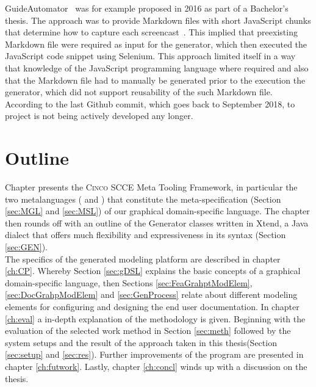 GuideAutomator~\cite{oliveira2016guideautomator} was for example proposed in 2016 as part of a Bachelor's thesis. The approach was to provide Markdown files with short JavaScript chunks that determine how to capture each screencast~\cite{guidAutomatorGithub}. This implied that preexisting Markdown file were required as input for the generator, which then executed the JavaScript code snippet using Selenium. This approach limited itself in a way that knowledge of the JavaScript programming language where required and also that the Markdown file had to manually be generated prior to the execution the generator, which did not support reusability of the such Markdown file. According to the last Github commit, which goes back to September 2018, to project is not being actively developed any longer.

\section{Outline}\label{sec:outline}

Chapter  presents the \textsc{Cinco} SCCE Meta Tooling Framework, in particular the two metalanguages ( and ) that constitute the meta-specification (Section \ref{sec:MGL} and \ref{sec:MSL}) of our graphical domain-specific language. The chapter then rounds off with an outline of the Generator classes written in Xtend, a Java dialect that offers much flexibility and expressiveness in its syntax (Section \ref{sec:GEN}).\\The specifics of the generated modeling platform are described in chapter \ref{ch:CP}. Whereby Section \ref{sec:gDSL} explains the basic concepts of a graphical domain-specific language, then Sections \ref{sec:FeaGrahptModElem}, \ref{sec:DocGrahpModElem} and \ref{sec:GenProcess} relate about different modeling elements for configuring and designing the end user documentation. In chapter \ref{ch:eval} a in-depth explanation of the methodology is given. Beginning with the evaluation of the selected work method in Section \ref{sec:meth} followed by the system setups and the result of the approach taken in this thesis(Section \ref{sec:setup} and \ref{sec:res}). Further improvements of the program are presented in chapter \ref{ch:futwork}. Lastly, chapter \ref{ch:concl} winds up with a discussion on the thesis.